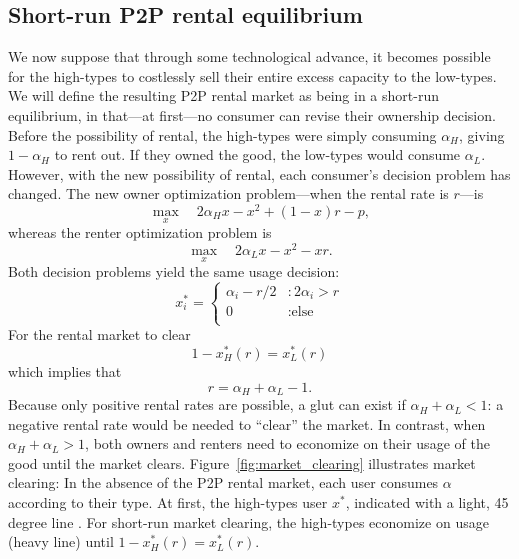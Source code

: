 \documentclass[11pt]{article}
\begin{document}
\subsection{Short-run P2P rental equilibrium} 
We now suppose that through some technological advance, it becomes possible for the high-types to costlessly sell their entire excess capacity to the low-types. 
We will define the resulting P2P rental market as being in a short-run equilibrium, in that---at first---no consumer can revise their ownership decision. 
Before the possibility of rental, the high-types were simply consuming $\alpha_H$, giving $1-\alpha_H$ to rent out.
If they owned the good, the low-types would consume $\alpha_L$. 
However, with the new possibility of rental, each consumer's decision problem has changed. 
The new owner optimization problem---when the rental rate is $r$---is 
\begin{equation}
\max_x \quad 2\alpha_H x - x^2 + (1-x)r - p,   
\end{equation} 
whereas the renter optimization problem is 
\begin{equation}
\max_x \quad 2 \alpha_L x - x^2 - xr.  
\end{equation} 
Both decision problems yield the same usage decision: 
\begin{equation}
x^*_i = \left\{
     \begin{array}{ll}
       \alpha_i - r/2 & : 2\alpha_i > r \\
       0 & : \mbox{else}  \\
     \end{array}
   \right.
\end{equation} 
For the rental market to clear 
\begin{equation} 
1 - x^*_H(r) = x^*_L(r)
\end{equation}   
which implies that 
\begin{equation} \label{eq:strr} 
r = \alpha_H + \alpha_L - 1.  
\end{equation} 
Because only positive rental rates are possible, a glut can exist if $\alpha_H + \alpha_L < 1$: a negative rental rate would be needed to ``clear'' the market.
In contrast, when $\alpha_H + \alpha_L > 1$, both owners and renters need to economize on their usage of the good until the market clears.   
Figure~\ref{fig:market_clearing} illustrates market clearing: 
In the absence of the P2P rental market, each user consumes $\alpha$ according to their type. 
At first, the high-types user $x^*$, indicated with a light, 45 degree line . 
For short-run market clearing, the high-types economize on usage (heavy line) until $1-x_H^*(r) = x_L^*(r)$. 
\end{document}
